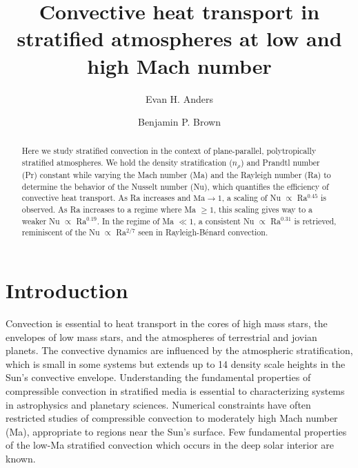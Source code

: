\documentclass[aps, prl, twocolumn, nofootinbib, groupedaddress, amsfonts, amssymb, amsmath]{revtex4-1}
\newcommand{\RB}{Rayleigh-B\'{e}nard }
\newcommand{\nrho}{\ensuremath{n_{\rho}}}
\begin{document}
\author{Evan H. Anders}
\author{Benjamin P. Brown}
\title{Convective heat transport in stratified atmospheres at low and high Mach number}

\begin{abstract}
Here we study stratified convection in the context of 
plane-parallel, polytropically stratified atmospheres. 
We hold the density stratification (\nrho) and Prandtl 
number (Pr) constant while varying the
Mach number (Ma) and the Rayleigh number (Ra) to determine 
the behavior of the Nusselt number (Nu), 
which quantifies the efficiency of convective heat transport.
As Ra increases and $\text{Ma} \rightarrow 1$, a scaling 
of Nu $\propto$ Ra$^{0.45}$ is observed.  
As Ra increases to a regime where Ma $\geq 1$,
this scaling gives way to a weaker Nu $\propto$ Ra$^{0.19}$. 
In the regime of Ma $\ll 1$, a consistent
Nu $\propto$ Ra$^{0.31}$ is retrieved,  reminiscent of the 
Nu $\propto$ Ra$^{2/7}$ seen in \RB convection.
\end{abstract}
\maketitle


\section{Introduction}
\label{sec:intro}
Convection is essential to heat transport in the cores of high mass stars,
the envelopes of low mass stars, and the atmospheres of terrestrial and 
jovian planets.  The convective dynamics are influenced by the atmospheric 
stratification, which is small in some systems but extends up to 
14 density scale heights in the Sun's convective envelope.
Understanding the fundamental
properties of compressible convection in stratified media is essential
to characterizing systems in astrophysics and planetary sciences.  
Numerical constraints have often restricted studies of compressible
convection to moderately high Mach number (Ma), appropriate to regions near 
the Sun's surface.  Few fundamental properties of the 
low-Ma stratified convection which occurs in the deep solar interior are known.
\end{document}
